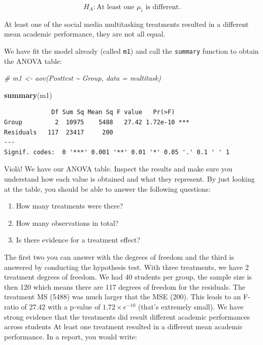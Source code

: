 \documentclass[
  letterpaper,
]{book}
\newenvironment{Shaded}{\begin{snugshade}}{\end{snugshade}}
\newcommand{\CommentTok}[1]{\textcolor[rgb]{0.56,0.35,0.01}{\textit{#1}}}
\newcommand{\FunctionTok}[1]{\textcolor[rgb]{0.13,0.29,0.53}{\textbf{#1}}}
\newcommand{\NormalTok}[1]{#1}
\providecommand{\tightlist}{%
  \setlength{\itemsep}{0pt}\setlength{\parskip}{0pt}}\usepackage{longtable,booktabs,array}
\begin{document}
\[H_A: \text{At least one } \mu_i \text{ is different.}\]

At least one of the social media multitasking treatments resulted in a
different mean academic performance, they are not all equal.

We have fit the model already (called \texttt{m1}) and call the
\texttt{summary} function to obtain the ANOVA table:

\begin{Shaded}
\begin{Highlighting}[]
\CommentTok{\# m1 \textless{}{-} aov(Posttest \textasciitilde{} Group, data = multitask)}

\FunctionTok{summary}\NormalTok{(m1)}
\end{Highlighting}
\end{Shaded}

\begin{verbatim}
             Df Sum Sq Mean Sq F value   Pr(>F)    
Group         2  10975    5488   27.42 1.72e-10 ***
Residuals   117  23417     200                     
---
Signif. codes:  0 '***' 0.001 '**' 0.01 '*' 0.05 '.' 0.1 ' ' 1
\end{verbatim}

Violà! We have our ANOVA table. Inspect the results and make sure you
understand how each value is obtained and what they represent. By just
looking at the table, you should be able to answer the following
questions:

\begin{enumerate}
\def\labelenumi{\arabic{enumi}.}
\tightlist
\item
  How many treatments were there?
\item
  How many observations in total?
\item
  Is there evidence for a treatment effect?
\end{enumerate}

The first two you can answer with the degrees of freedom and the third
is answered by conducting the hypothesis test. With three treatments, we
have 2 treatment degrees of freedom. We had 40 students per group, the
sample size is then 120 which means there are 117 degrees of freedom for
the residuals. The treatment MS (5488) was much larger that the MSE
(200). This leads to an F-ratio of 27.42 with a p-value of
\(1.72\times e^{-10}\) (that's extremely small). We have strong evidence
that the treatments did result different academic performances across
students At least one treatment resulted in a different mean academic
performance. In a report, you would write:
\end{document}
